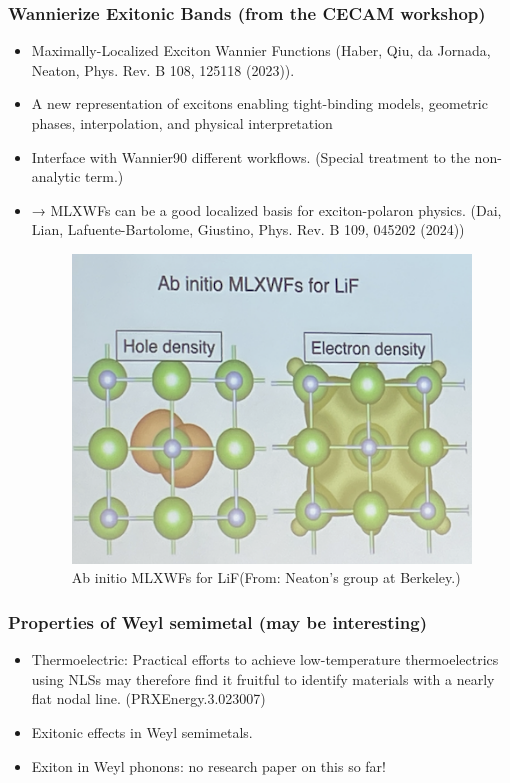 \documentclass{CustomBeamer}
\begin{document}
        \begin{frame}
            \frametitle{Wannierize Exitonic Bands (from the CECAM workshop) }
            \begin{itemize}
                \item   Maximally-Localized Exciton Wannier Functions (Haber, Qiu, da Jornada, Neaton, Phys. Rev. B 108, 125118 (2023)).
                \item A new representation of excitons enabling tight-binding models, geometric phases, interpolation, and physical interpretation
                \item Interface with Wannier90 different workflows. (Special treatment to the non-analytic term.)
                \item → MLXWFs can be a good localized basis for exciton-polaron physics. (Dai, Lian, Lafuente-Bartolome, Giustino, Phys. Rev. B 109, 045202 (2024))
                \begin{figure}
                    \centering
                    \includegraphics[width=0.3\linewidth]{exitonwannier.png}
                    \caption{Ab initio MLXWFs for LiF(From: Neaton's group at Berkeley.)            }
                \end{figure}
            \end{itemize}
            \end{frame}

            \begin{frame}
                \frametitle{Properties of Weyl semimetal (may be interesting)}
                \begin{itemize}
                   \item Thermoelectric: Practical efforts to achieve low-temperature thermoelectrics using NLSs may therefore find it fruitful to identify materials with a nearly flat nodal line. (PRXEnergy.3.023007)   
                   \item Exitonic effects in Weyl semimetals.
                   \item Exiton in Weyl phonons: no research paper on this so far!
                \end{itemize}
            \end{frame}
\end{document}
